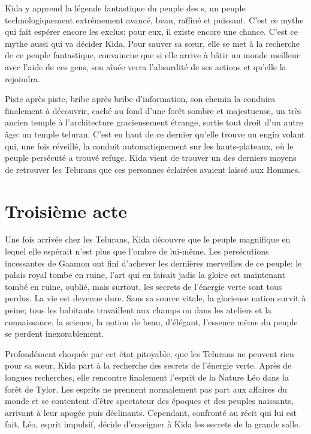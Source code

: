 Kida y apprend la légende fantastique du peuple des \nomNaturels s, un peuple technologiquement extrêmement avancé, beau, raffiné et puissant. C'est ce mythe qui fait espérer encore les exclus; pour eux, il existe encore une chance. C'est ce mythe aussi qui va décider Kida. Pour sauver sa s\oe ur, elle se met à la recherche de ce peuple fantastique, convaincue que si elle arrive à bâtir un monde meilleur avec l'aide de ces gens, son aînée verra l'absurdité de ses actions et qu'elle la rejoindra.

Piste après piste, bribe après bribe d'information, son chemin la conduira finalement à découvrir, caché au fond d'une forêt sombre et majestueuse, un très ancien temple à l'architecture gracieusement étrange, sortie tout droit d'un autre âge: un temple teluran. C'est en haut de ce dernier qu'elle trouve un engin volant qui, une fois réveillé, la conduit automatiquement sur les hauts-plateaux, où le peuple persécuté a trouvé refuge. Kida vient de trouver un des derniers moyens de retrouver les Telurans que ces personnes éclairées avaient laissé aux Hommes.

\section{Troisième acte}
\label{sec:troisiemeActe}
Une fois arrivée chez les Telurans, Kida découvre que le peuple magnifique en lequel elle espérait n'est plus que l'ombre de lui-même. Les persécutions incessantes de Gaamon ont fini d'achever les dernières merveilles de ce peuple: le palais royal tombe en ruine, l'art qui en faisait jadis la gloire est maintenant tombé en ruine, oublié, mais surtout, les secrets de l'énergie verte sont tous perdus. La vie est devenue dure. Sans sa source vitale, la glorieuse nation survit à peine; tous les habitants travaillent aux champs ou dans les ateliers et la connaissance, la science, la notion de beau, d'élégant, l'essence même du peuple se perdent inexorablement.

Profondément choquée par cet état pitoyable, que les Telurans ne peuvent rien pour sa s\oe ur, Kida part à la recherche des secrets de l'énergie verte. Après de longues recherches, elle rencontre finalement l'esprit de la Nature Léo dans la forêt de Tylor. Les esprits ne prennent normalement pas part aux affaires du monde et se contentent d'être spectateur des époques et des peuples naissants, arrivant à leur apogée puis déclinants. Cependant, confronté au récit qui lui est fait, Léo, esprit impulsif, décide d'enseigner à Kida les secrets de la grande salle.


